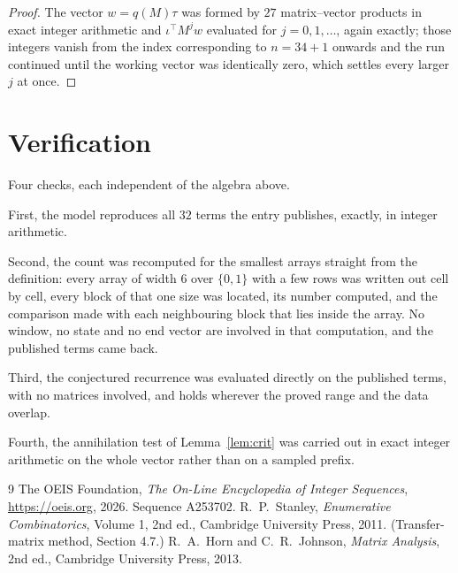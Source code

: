 \documentclass[11pt,a4paper]{article}
\theoremstyle{plain}
\theoremstyle{definition}
\begin{document}
\begin{proof}
The vector $w=q(M)\tau$ was formed by $27$ matrix--vector products in exact integer
arithmetic and $\iota^{\!\top}M^{j}w$ evaluated for $j=0,1,\dots$, again exactly; those
integers vanish from the index corresponding to $n=34+1$ onwards and the run continued
until the working vector was identically zero, which settles every larger $j$ at once.
\end{proof}

\section{Verification}

Four checks, each independent of the algebra above.

First, the model reproduces all $32$ terms the entry publishes, exactly, in integer
arithmetic.

Second, the count was recomputed for the smallest arrays straight from the definition: every
array of width $6$ over $\{0,1\}$ with a few rows was written out cell by cell, every block of
that one size was located, its number computed, and the comparison made with each neighbouring block
that lies inside the array. No window, no state and no end vector are involved in that
computation, and the published terms came back.

Third, the conjectured recurrence was evaluated directly on the published terms, with no
matrices involved, and holds wherever the proved range and the data overlap.

Fourth, the annihilation test of Lemma~\ref{lem:crit} was carried out in exact integer
arithmetic on the whole vector rather than on a sampled prefix.

\begin{thebibliography}{9}
 The OEIS Foundation, \emph{The On-Line Encyclopedia of Integer
Sequences}, \url{https://oeis.org}, 2026. Sequence A253702.
 R.~P.~Stanley, \emph{Enumerative Combinatorics}, Volume 1, 2nd ed.,
Cambridge University Press, 2011. (Transfer-matrix method, Section 4.7.)
 R.~A.~Horn and C.~R.~Johnson, \emph{Matrix Analysis}, 2nd ed., Cambridge
University Press, 2013.
\end{thebibliography}
\end{document}

